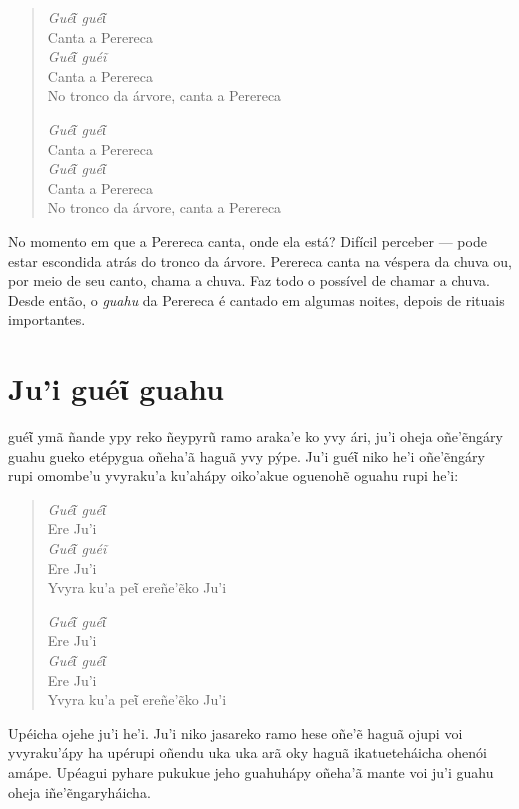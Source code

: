 \begin{verse}
\textit{Guéῖ guéῖ}\\
Canta a Perereca\\
\textit{Guéῖ guéĩ}\\
Canta a Perereca\\
No tronco da árvore, canta a Perereca

\textit{Guéῖ guéῖ}\\
Canta a Perereca\\
\textit{Guéῖ guéῖ}\\
Canta a Perereca\\
No tronco da árvore, canta a Perereca
\end{verse}

No momento em que a Perereca canta, onde ela está? Difícil perceber ---
pode estar escondida atrás do tronco da árvore. Perereca canta na
véspera da chuva ou, por meio de seu canto, chama a chuva. Faz todo o
possível de chamar a chuva. Desde então, o \textit{guahu} da Perereca é
cantado em algumas noites, depois de rituais importantes.

\chapter{Ju'i guéῖ guahu}

 guéῖ ymã ñande ypy reko ñeypyrũ ramo araka'e ko yvy ári, ju'i oheja
oñe'ẽngáry guahu gueko etépygua oñeha'ã haguã yvy pýpe. Ju'i guéῖ niko
he'i oñe'ẽngáry rupi omombe'u yvyraku'a ku'ahápy oiko'akue oguenohẽ
oguahu rupi he'i:


\begin{verse}
\textit{Guéῖ guéῖ}\\
Ere Ju'i\\
\textit{Guéῖ guéĩ}\\
Ere Ju'i\\
Yvyra ku'a peῖ ereñe'ẽko Ju'i
        
\textit{Guéῖ guéῖ}\\ 
Ere Ju'i\\
\textit{Guéῖ guéῖ}\\
Ere Ju'i\\
Yvyra ku'a peῖ ereñe'ẽko Ju'i 
\end{verse}

Upéicha ojehe ju'i he'i. Ju'i niko jasareko ramo hese oñe'ẽ haguã ojupi
voi yvyraku'ápy ha upérupi oñendu uka uka arã oky haguã ikatueteháicha
ohenói amápe. Upéagui pyhare pukukue jeho guahuhápy oñeha'ã mante voi
ju'i guahu oheja iñe'ẽngaryháicha.

